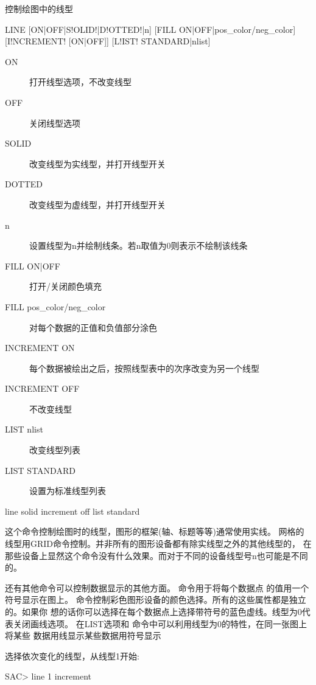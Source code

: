 \label{cmd:line}

控制绘图中的线型

\begin{SACSTX}
LINE [ON|OFF|S!OLID!|D!OTTED!|n] [FILL ON|OFF|pos\_color/neg\_color]
    [I!NCREMENT! [ON|OFF]] [L!IST! STANDARD|nlist]
\end{SACSTX}

\begin{description}
\item [ON] 打开线型选项，不改变线型
\item [OFF] 关闭线型选项
\item [SOLID] 改变线型为实线型，并打开线型开关
\item [DOTTED] 改变线型为虚线型，并打开线型开关
\item [n] 设置线型为n并绘制线条。若n取值为0则表示不绘制该线条
\item [FILL ON|OFF] 打开/关闭颜色填充
\item [FILL pos\_color/neg\_color] 对每个数据的正值和负值部分涂色
\item [INCREMENT ON] 每个数据被绘出之后，按照线型表中的次序改变为另一个线型
\item [INCREMENT OFF] 不改变线型
\item [LIST nlist] 改变线型列表
\item [LIST STANDARD] 设置为标准线型列表
\end{description}

\begin{SACDFT}
line solid increment off list standard
\end{SACDFT}

这个命令控制绘图时的线型，图形的框架(轴、标题等等)通常使用实线。
网格的线型用GRID命令控制。并非所有的图形设备都有除实线型之外的其他线型的，
在那些设备上显然这个命令没有什么效果。而对于不同的设备线型号n也可能是不同的。

还有其他命令可以控制数据显示的其他方面。 命令用于将每个数据点
的值用一个符号显示在图上。
 命令控制彩色图形设备的颜色选择。所有的这些属性都是独立的。如果你
想的话你可以选择在每个数据点上选择带符号的蓝色虚线。线型为0代表关闭画线选项。
在LIST选项和  命令中可以利用线型为0的特性，在同一张图上将某些
数据用线显示某些数据用符号显示

选择依次变化的线型，从线型1开始:
\begin{SACCode}
SAC> line 1 increment
\end{SACCode}

